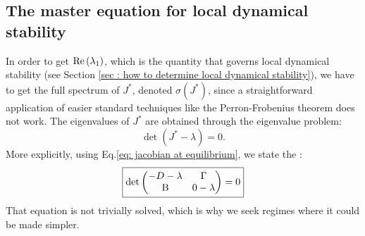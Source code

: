 \documentclass[12pt, titlepage]{report}
\begin{document}
\subsection{The master equation for local dynamical stability}\label{sec : establish master equation for dynamical stability}
In order to get $\text{Re}\left(\lambda_1\right)$, which is the quantity that governs local dynamical stability (see Section \ref{sec : how to determine local dynamical stability}), we have to get the full spectrum of $J^*$, denoted $\sigma(J^*)$, since a straightforward application of easier standard techniques like the Perron-Frobenius theorem \cite{perron_zur_nodate} does not work. The eigenvalues of $J^*$ are obtained through the eigenvalue problem:
\begin{equation}
\det\left(J^* - \lambda \right) = 0.
\end{equation}
More explicitly, using Eq.\eqref{eq: jacobian at equilibrium}, we state the :
\begin{equation}
\boxed{
\det
\begin{pmatrix}
 -D - \lambda  & \Gamma \\
 \text{B} & 0-\lambda
\end{pmatrix} = 0
}
\end{equation}
That equation is not trivially solved, which is why we seek regimes where it could be made simpler.
\end{document}
